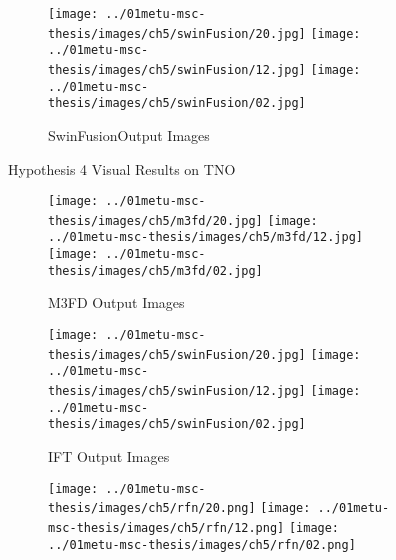 \begin{figure}[htbp]
    \vspace{0.01cm}
    \begin{subfigure}[b]{\textwidth}
        \texttt{[image: ../01metu-msc-thesis/images/ch5/swinFusion/20.jpg]}
        \texttt{[image: ../01metu-msc-thesis/images/ch5/swinFusion/12.jpg]}
        \texttt{[image: ../01metu-msc-thesis/images/ch5/swinFusion/02.jpg]}
        \caption{SwinFusion\cite{ma2022swinfusion}Output Images}
        \label{fig:ch5:met5:swin}
    \end{subfigure}
    \caption{Hypothesis 4 Visual Results on TNO}
    \label{fig:ch5:met5}
\end{figure}

\begin{figure}[htbp]
    \centering
    \begin{subfigure}[b]{\textwidth}
        \texttt{[image: ../01metu-msc-thesis/images/ch5/m3fd/20.jpg]}
        \texttt{[image: ../01metu-msc-thesis/images/ch5/m3fd/12.jpg]}
        \texttt{[image: ../01metu-msc-thesis/images/ch5/m3fd/02.jpg]}
        \caption{M3FD\cite{liu2022target} Output Images}
        \label{fig:ch5:met5:m3fd}
    \end{subfigure}
    \vspace{0.01cm}
    \begin{subfigure}[b]{\textwidth}
        \texttt{[image: ../01metu-msc-thesis/images/ch5/swinFusion/20.jpg]}
        \texttt{[image: ../01metu-msc-thesis/images/ch5/swinFusion/12.jpg]}
        \texttt{[image: ../01metu-msc-thesis/images/ch5/swinFusion/02.jpg]}
        \caption{IFT\cite{vs2022image} Output Images}
        \label{fig:ch5:met5:ift}
    \end{subfigure}
    \vspace{0.01cm}
    \begin{subfigure}[b]{\textwidth}
        \texttt{[image: ../01metu-msc-thesis/images/ch5/rfn/20.png]}
        \texttt{[image: ../01metu-msc-thesis/images/ch5/rfn/12.png]}
        \texttt{[image: ../01metu-msc-thesis/images/ch5/rfn/02.png]}

\end{subfigure}
\end{figure}
